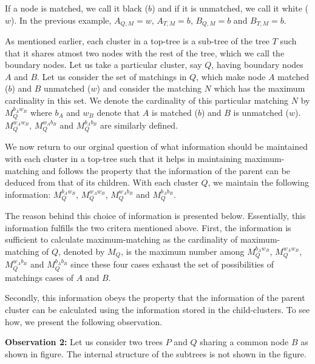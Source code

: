 \documentclass[a4paper,12pt]{article}
\begin{document}
If a node is matched, we call it black ($b$) and if it is unmatched, we call it white ($w$). In the previous example, $A_{Q,M}=w$, $A_{T,M}=b$, $B_{Q,M}=b$ and $B_{T,M}=b$.


As mentioned earlier, each cluster in a top-tree is a sub-tree of the tree $T$ such that it shares atmost two nodes with the rest of the tree, which we call the boundary nodes. Let us take a particular cluster, say $Q$, having boundary nodes $A$ and $B$. Let us consider the set of matchings in $Q$, which make node $A$ matched ($b$) and $B$ unmatched ($w$) and consider the matching $N$ which has the maximum cardinality in this set. We denote the cardinality of this particular matching $N$ by $M_{Q}^{b_{A}w_{B}}$ where $b_{A}$ and $w_{B}$ denote that $A$ is matched ($b$) and $B$ is unmatched ($w$). $M_{Q}^{w_{A}w_{B}}$, $M_{Q}^{w_{A}b_{B}}$ and $M_{Q}^{b_{A}b_{B}}$ are similarly defined.

We now return to our orginal question of what information should be maintained with each cluster in a top-tree such that it helps in maintaining maximum-matching and follows the property that the information of the parent can be deduced from that of its children. With each cluster $Q$, we maintain the following information: $M_{Q}^{b_{A}w_{B}}$, $M_{Q}^{w_{A}w_{B}}$, $M_{Q}^{w_{A}b_{B}}$ and $M_{Q}^{b_{A}b_{B}}$. 

The reason behind this choice of information is presented below.  Essentially, this information fulfills the two critera mentioned above. First, the information is sufficient to calculate maximum-matching as the cardinality of maximum-matching of $Q$, denoted by $M_{Q}$, is the maximum number among $M_{Q}^{b_{A}w_{B}}$, $M_{Q}^{w_{A}w_{B}}$, $M_{Q}^{w_{A}b_{B}}$ and $M_{Q}^{b_{A}b_{B}}$ since these four cases exhaust the set of possibilities of matchings cases of $A$ and $B$.

Secondly, this information obeys the property that the information of the parent cluster can be calculated using the information stored in the child-clusters. To see how, we present the following observation.


{\bf Observation 2:} Let us consider two trees $P$ and $Q$ sharing a common node $B$ as shown in figure. The internal structure of the subtrees is not shown in the figure. 

\end{document}
